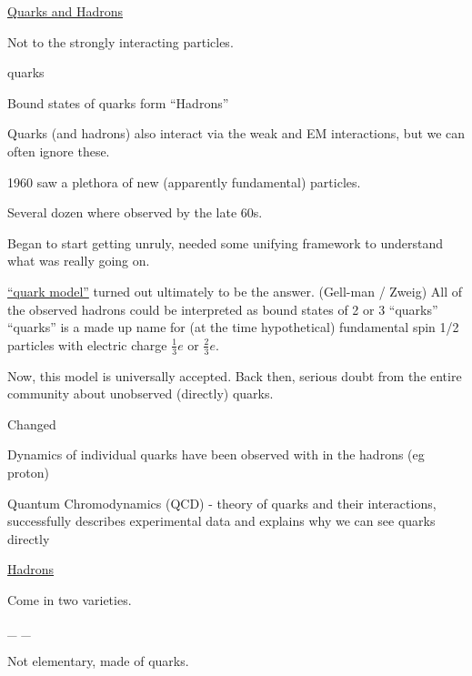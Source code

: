 {\fontsize{14}{16}\selectfont

\underline{Quarks and Hadrons}

Not to the strongly interacting particles. 

\begin{center}
quarks 
\end{center}

Bound states of quarks form ``Hadrons''

Quarks (and hadrons) also interact via the weak and EM interactions, but we can often ignore these. 

1960 saw a plethora of new (apparently fundamental) particles. 

Several dozen where observed by the late 60s. 

Began to start getting unruly, needed some unifying framework to understand what was really going on. 

\underline{``quark model''} turned out ultimately to be the answer. (Gell-man / Zweig) 
All of the observed hadrons could be interpreted as bound states of 2 or 3 ``quarks''
``quarks'' is a made up name for (at the time hypothetical) fundamental spin 1/2 particles with electric charge $\frac{1}{3} e$ or $\frac{2}{3} e$.

Now, this model is universally accepted. 
Back then, serious doubt from the entire community about unobserved (directly) quarks. 
 
Changed
\bi
\item[-] Dynamics of individual quarks have been observed with in the hadrons (eg proton) 
\item[-] Quantum Chromodynamics (QCD) - theory of quarks and their interactions, successfully describes experimental data and explains why we can see quarks directly
\ei

\clearpage

\underline{Hadrons}

Come in two varieties.

\be
{}_{} \hspace*{1in} _{} 
\ee

Not elementary, made of quarks. 

}
